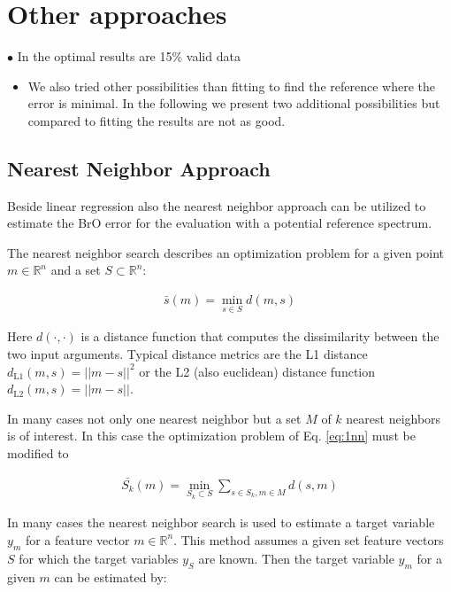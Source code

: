 \documentclass  [
  paper    = a4,
  BCOR     = 10mm,
  twoside,
  fontsize = 12pt,
  fleqn,
  toc      = bibnumbered,
  toc      = listofnumbered,
  numbers  = noendperiod,
  headings = normal,
  listof   = leveldown,
  version  = 3.03
]                                       {scrreprt}
\begin{document}
	\section{Other approaches}

	$\bullet$ In the optimal results are 15$\%$ valid data
	\begin{itemize}
		\item We also tried other possibilities than fitting to find the reference where the  error is minimal. In the following we present two additional possibilities but compared to fitting the results are not as good.
	\end{itemize}

\subsection{Nearest Neighbor Approach}


Beside linear regression also the nearest neighbor approach can be utilized to estimate the BrO error for the evaluation with a potential reference spectrum.


The nearest neighbor search describes an optimization problem for a given point $m \in \mathbb{R}^n$ and a set $S \subset \mathbb{R}^n$:

%

\begin{align}
\bar{s}(m) = \min_{s \in S} d(m, s) \label{eq:1nn}
\end{align}

%
Here $d(\cdot, \cdot)$ is a distance function that computes the dissimilarity between the two input arguments. Typical distance metrics are the L1 distance $d_{\text{L1} 	
}(m, s) = ||m - s||^2$ or the L2 (also euclidean) distance function $d_{\text{L2} 
}(m, s) = ||m - s||$. 


In many cases not only one nearest neighbor but a set $M$ of $k$ nearest neighbors is of interest. In this case the optimization problem of Eq. \ref{eq:1nn} must be modified to

%

\begin{align}
\bar{S_k}(m) = \min_{S_k \subset S} \sum_{s \in S_k, m \in M} d(s, m) \label{eq:knn}
\end{align}

%

In many cases the nearest neighbor search is used to estimate a target variable $y_m$ for a feature vector $m \in \mathbb{R}^n$. This method assumes a given set feature vectors $S$ for which the target variables $y_S$ are known. Then the target variable $y_m$ for a given $m$ can be estimated by:
\end{document}
